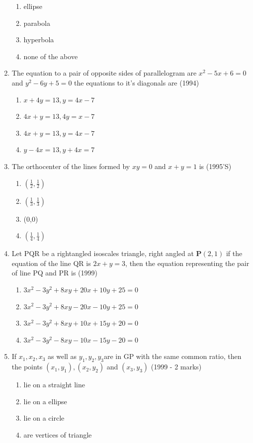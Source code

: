 \documentclass[12pt]{article}
\providecommand{\brak}[1]{\ensuremath{\left(#1\right)}}
\let\vec\mathbf
\begin{document}
\begin{enumerate}
\begin{enumerate}
\item ellipse 
\item parabola  
\item hyperbola  
\item none of the above
\end{enumerate}
\item The equation to a pair of  opposite sides of parallelogram are $x^2-5x+6=0$ and $y^2-6y+5=0$ the equations to it's diagonals are (1994)
\begin{enumerate}
\item $x+4y=13, y=4x-7$  
\item $4x+y=13, 4y=x-7$ 
\item $4x+y=13, y=4x-7$
\item $y-4x=13,y+4x=7$ 
\end{enumerate}
\item The orthocenter of the lines formed by $xy=0$ and $x+y=1$ is (1995'S)
\begin{enumerate}
\item $\brak{\frac{1}{2},\frac{1}{2}}$
\item $\brak{\frac{1}{3},\frac{1}{3}}$
\item (0,0)
\item $\brak{\frac{1}{4},\frac{1}{4}}$
\end{enumerate}
\item Let PQR be a rightangled isoscales triangle, right angled at $\vec{P}(2,1)$ if the equation of the line QR is $2x+y=3$, then the equation representing the pair of line PQ and PR is (1999)\\
\begin{enumerate}
\item $3x^2-3y^2+8xy+20x+10y+25=0$
\item $3x^2-3y^2+8xy-20x-10y+25=0$
\item $3x^2-3y^2+8xy+10x+15y+20=0$
\item $3x^2-3y^2-8xy-10x-15y-20=0$
\end{enumerate}
\item If $x_1,x_2,x_3$ as well as $y_1,y_2,y_3 $are in GP with the same common ratio, then the points $(x_1,y_1),(x_2,y_2)$ and $(x_3,y_3)$ (1999 - 2 marks)\\
\begin{enumerate}
\item lie on a straight line 
\item lie on a ellipse 
\item lie on a circle  
\item are vertices of triangle 

\end{enumerate}
\end{enumerate}
\end{document}
